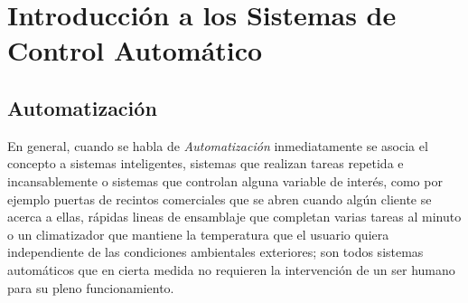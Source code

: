 \documentclass[letterpaper, 10pt]{report}
\begin{document}
\chapter{Introducción a los Sistemas de Control Automático}

\section{Automatización}
En general, cuando se habla de \emph{Automatización} inmediatamente se asocia el concepto a sistemas inteligentes, sistemas que realizan tareas repetida e incansablemente o sistemas que controlan alguna variable de interés, como por ejemplo puertas de recintos comerciales que se abren cuando algún cliente se acerca a ellas, rápidas lineas de ensamblaje que completan varias tareas al minuto o un climatizador que mantiene la temperatura que el usuario quiera independiente de las condiciones ambientales exteriores; son todos sistemas automáticos que en cierta medida no requieren la intervención de un ser humano para su pleno funcionamiento.
\vspace{10pt}
\end{document}
